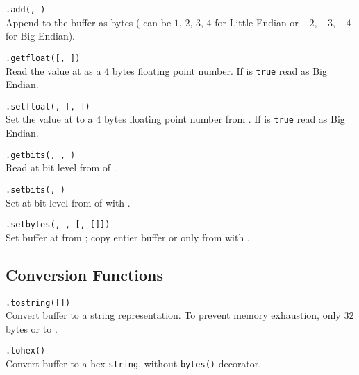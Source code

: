 \hangpar {}\texttt{.add(}\texttt{, }\texttt{)} \\
Append  to the  buffer as  bytes ( can be $1$, $2$, $3$, $4$ for Little Endian or $-2$, $-3$, $-4$ for Big Endian).

\hangpar {}\texttt{.getfloat(}\texttt{[, }\texttt{])} \\
Read the value at  as a 4 bytes floating point number. If  is \texttt{true} read as Big Endian.

\hangpar {}\texttt{.setfloat(}\texttt{, }\texttt{[, }\texttt{])} \\
Set the value at  to a 4 bytes floating point number from . If  is \texttt{true} read as Big Endian.

\hangpar {}\texttt{.getbits(}\texttt{, }\texttt{, }\texttt{)} \\
Read at bit level from  of .

\hangpar {}\texttt{.setbits(}\texttt{, }\texttt{)} \\
Set at bit level from  of  with .

\hangpar {}\texttt{.setbytes(}\texttt{, }\texttt{, [}\texttt{, [}\texttt{]])}\\
Set buffer at  from ; copy entier buffer or only from  with .

\subsection*{Conversion Functions}

\hangpar {}\texttt{.tostring([}\texttt{])}\\
Convert  buffer to a string representation. To prevent memory exhaustion, only $32$ bytes or to .

\hangpar {}\texttt{.tohex()}\\
Convert  buffer to a hex \texttt{string}, without \texttt{bytes()} decorator.


